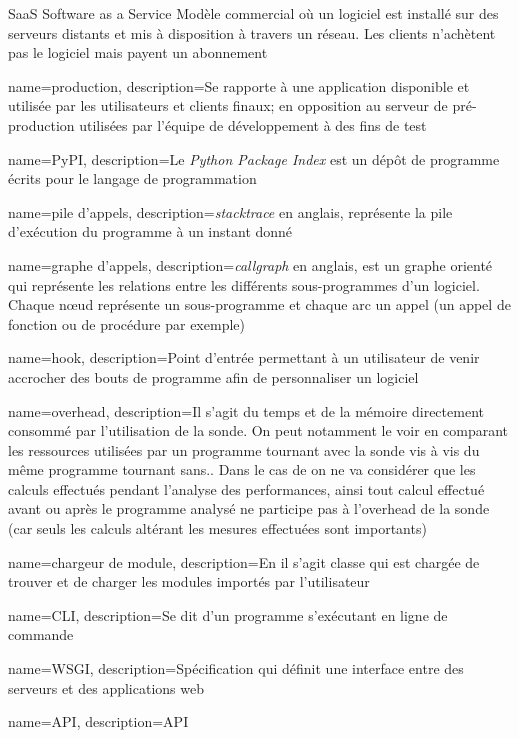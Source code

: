 \usepackage{xparse}
 {
}

  {SaaS}            %
  {Software as a Service}  %
  {Modèle commercial o\`u un logiciel est installé sur des serveurs distants et mis à disposition à travers un réseau. Les clients n'achètent pas le logiciel mais payent un abonnement} %

{
  name=production,
  description=Se rapporte à une application disponible et utilisée par les utilisateurs et clients finaux; en opposition au serveur de pré-production utilisées par l'équipe de développement à des fins de test
}
 
{
  name=PyPI,
  description=Le \emph{Python Package Index} est un dépôt de programme écrits pour le langage de programmation \Python
}
 
{
  name=pile d'appels,
  description={\emph{stacktrace} en anglais, représente la pile d'exécution du programme à un instant donné}
}
 
{
  name=graphe d'appels,
  description={\emph{callgraph} en anglais, est un graphe orienté qui représente les relations entre les différents sous-programmes d'un logiciel. Chaque nœud représente un sous-programme et chaque arc un appel (un appel de fonction ou de procédure par exemple)}
}
 
{
  name=hook,
  description=Point d'entrée permettant à un utilisateur de venir accrocher des bouts de programme afin de personnaliser un logiciel
}
 
{
  name=overhead,
  description={Il s'agit du temps et de la mémoire directement consommé par l'utilisation de la sonde. On peut notamment le voir en comparant les ressources utilisées par un programme tournant avec la sonde vis à vis du même programme tournant sans.. Dans le cas de \Blackfire on ne va considérer que les calculs effectués pendant l'analyse des performances, ainsi tout calcul effectué avant ou après le programme analysé ne participe pas à l'overhead de la sonde (car seuls les calculs altérant les mesures effectuées sont importants)}
}
 
{
  name=chargeur de module,
  description={En \Python il s'agit classe qui est chargée de trouver et de charger les modules importés par l'utilisateur}
}
 
{
  name=CLI,
  description=Se dit d'un programme s'exécutant en ligne de commande
}
 
{
  name=WSGI,
  description=Spécification qui définit une interface entre des serveurs et des applications web \Python
}
 
{
  name=API,
  description=API
}